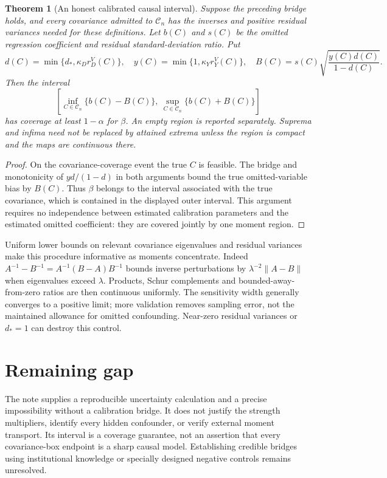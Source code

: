 \documentclass[11pt]{article}
\newtheorem{theorem}{Theorem}
\theoremstyle{remark}
\begin{document}
\begin{theorem}[An honest calibrated causal interval]
Suppose the preceding bridge holds, and every covariance admitted to $\mathcal C_n$ has the inverses and positive residual variances needed for these definitions. Let $b(C)$ and $s(C)$ be the omitted regression coefficient and residual standard-deviation ratio. Put
\[
 d(C)=\min\{d_*,\kappa_Dr_D^V(C)\},\quad
 y(C)=\min\{1,\kappa_Yr_Y^V(C)\},\quad
 B(C)=s(C)\sqrt{\frac{y(C)d(C)}{1-d(C)}}.
\]
Then the interval
\[
 \left[\inf_{C\in\mathcal C_n}\{b(C)-B(C)\},\
       \sup_{C\in\mathcal C_n}\{b(C)+B(C)\}\right]
\]
has coverage at least $1-\alpha$ for $\beta$. An empty region is reported separately. Suprema and infima need not be replaced by attained extrema unless the region is compact and the maps are continuous there.
\end{theorem}
\begin{proof}
On the covariance-coverage event the true $C$ is feasible. The bridge and monotonicity of $yd/(1-d)$ in both arguments bound the true omitted-variable bias by $B(C)$. Thus $\beta$ belongs to the interval associated with the true covariance, which is contained in the displayed outer interval. This argument requires no independence between estimated calibration parameters and the estimated omitted coefficient: they are covered jointly by one moment region.
\end{proof}
Uniform lower bounds on relevant covariance eigenvalues and residual variances make this procedure informative as moments concentrate. Indeed
$A^{-1}-B^{-1}=A^{-1}(B-A)B^{-1}$ bounds inverse perturbations by $\lambda^{-2}\|A-B\|$ when eigenvalues exceed $\lambda$. Products, Schur complements and bounded-away-from-zero ratios are then continuous uniformly. The sensitivity width generally converges to a positive limit; more validation removes sampling error, not the maintained allowance for omitted confounding. Near-zero residual variances or $d_*=1$ can destroy this control.

\section*{Remaining gap}
The note supplies a reproducible uncertainty calculation and a precise impossibility without a calibration bridge. It does not justify the strength multipliers, identify every hidden confounder, or verify external moment transport. Its interval is a coverage guarantee, not an assertion that every covariance-box endpoint is a sharp causal model. Establishing credible bridges using institutional knowledge or specially designed negative controls remains unresolved.
\end{document}
